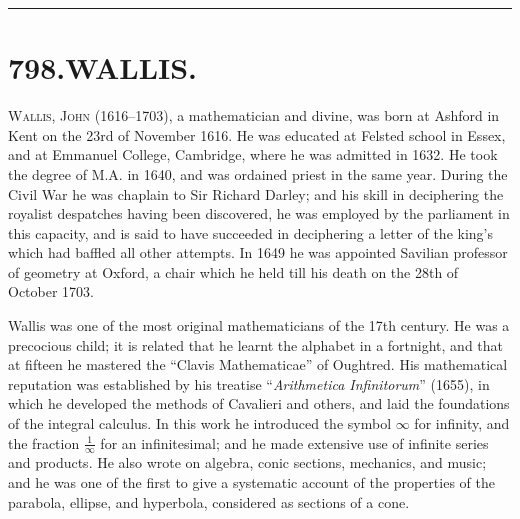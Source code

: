 \documentclass[11pt,a4paper]{book}
\begin{document}
\vspace{1em}
\hrule
\vspace{1em}



\section*{798.\quad WALLIS.}


\smallskip

\textsc{Wallis, John} (1616--1703), a mathematician and divine, was born at Ashford in Kent on the 23rd of November 1616. He was educated at Felsted school in Essex, and at Emmanuel College, Cambridge, where he was admitted in 1632. He took the degree of M.A. in 1640, and was ordained priest in the same year. During the Civil War he was chaplain to Sir Richard Darley; and his skill in deciphering the royalist despatches having been discovered, he was employed by the parliament in this capacity, and is said to have succeeded in deciphering a letter of the king's which had baffled all other attempts. In 1649 he was appointed Savilian professor of geometry at Oxford, a chair which he held till his death on the 28th of October 1703.

Wallis was one of the most original mathematicians of the 17th century. He was a precocious child; it is related that he learnt the alphabet in a fortnight, and that at fifteen he mastered the ``Clavis Mathematicae'' of Oughtred. His mathematical reputation was established by his treatise ``\textit{Arithmetica Infinitorum}'' (1655), in which he developed the methods of Cavalieri and others, and laid the foundations of the integral calculus. In this work he introduced the symbol $\infty$ for infinity, and the fraction $\frac{1}{\infty}$ for an infinitesimal; and he made extensive use of infinite series and products. He also wrote on algebra, conic sections, mechanics, and music; and he was one of the first to give a systematic account of the properties of the parabola, ellipse, and hyperbola, considered as sections of a cone.
\end{document}
